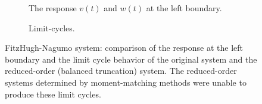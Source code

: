 \begin{figure}[!tb]
        \centering
        \begin{center}
\end{center}
\begin{subfigure}[t]{0.49\textwidth}
	\centering
	\setlength\fheight{2.5cm}
	\setlength\fwidth{4cm}
	\caption{The response $v(t)$ and $w(t)$ at the left boundary.}
	\label{fig:Fitz_output}
\end{subfigure}
 \begin{subfigure}[t]{0.45\textwidth}
  \centering
  	\setlength\fheight{2.5cm}
	\setlength{}
{\caption{ Limit-cycles.}}
 \end{subfigure}
 \caption{FitzHugh-Nagumo system: comparison of the response at the left boundary and the limit cycle behavior of the original system and the reduced-order (balanced truncation) system. The reduced-order systems determined by moment-matching methods were unable to produce these limit cycles.}
 \label{fig:fitz_limit}
\end{figure}



